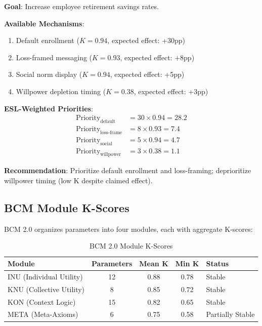 \documentclass[11pt,a4paper]{article}
\theoremstyle{remark}
\begin{document}
\begin{examplebox}[title={Retirement Savings Intervention}]
\textbf{Goal}: Increase employee retirement savings rates.

\textbf{Available Mechanisms}:
\begin{enumerate}
    \item Default enrollment ($K = 0.94$, expected effect: +30pp)
    \item Loss-framed messaging ($K = 0.93$, expected effect: +8pp)
    \item Social norm display ($K = 0.94$, expected effect: +5pp)
    \item Willpower depletion timing ($K = 0.38$, expected effect: +3pp)
\end{enumerate}

\textbf{ESL-Weighted Priorities}:
\begin{align}
\text{Priority}_{\text{default}} &= 30 \times 0.94 = 28.2 \\
\text{Priority}_{\text{loss-frame}} &= 8 \times 0.93 = 7.4 \\
\text{Priority}_{\text{social}} &= 5 \times 0.94 = 4.7 \\
\text{Priority}_{\text{willpower}} &= 3 \times 0.38 = 1.1
\end{align}

\textbf{Recommendation}: Prioritize default enrollment and loss-framing; deprioritize willpower timing (low K despite claimed effect).
\end{examplebox}

\subsection{BCM Module K-Scores}

BCM 2.0 organizes parameters into four modules, each with aggregate K-scores:

\begin{table}[h]
\centering
\caption{BCM 2.0 Module K-Scores}
\label{tab:bcm-modules}
\begin{tabular}{lcccl}
\toprule
\textbf{Module} & \textbf{Parameters} & \textbf{Mean K} & \textbf{Min K} & \textbf{Status} \\
\midrule
INU (Individual Utility) & 12 & 0.88 & 0.78 & Stable \\
KNU (Collective Utility) & 8 & 0.85 & 0.72 & Stable \\
KON (Context Logic) & 15 & 0.82 & 0.65 & Stable \\
META (Meta-Axioms) & 6 & 0.75 & 0.58 & Partially Stable \\
\bottomrule
\end{tabular}
\end{table}
\end{document}
